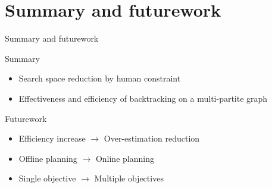 \section{Summary and futurework}

\begin{frame}{Summary and futurework}

\begin{block}{Summary}
\begin{itemize}
\item Search space reduction by \alert{human constraint}
\item Effectiveness and efficiency of \alert{backtracking} on a multi-partite graph
\end{itemize}
\end{block}

\bigskip

\begin{block}{Futurework}
\begin{itemize}
\item Efficiency increase  $ \rightarrow $ Over-estimation reduction
\item Offline planning $ \rightarrow $ Online planning
\item Single objective $ \rightarrow $ Multiple objectives
\end{itemize}
\end{block}

\end{frame}